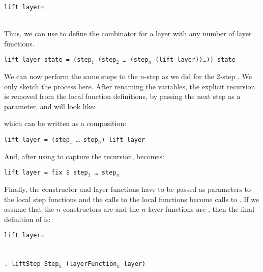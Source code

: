 \begin{small}
\begin{tabbing}
{\tt li}\={\tt ft l}\={\tt ayer= }\\
\\
\end{tabbing}
\end{small}

Thus, we can use   to define the  combinator for a layer with any number of layer functions.

\bc
\begin{tabbing}
{\tt l}\={\tt ift layer state = (step$_1$ (step$_2$ \dots ~(step$_n$ (lift layer))\dots)) state}\\
\end{tabbing}

We can now perform the same steps to the $n$-step  as we did for the 2-step . We only sketch the process here. After renaming the variables, the explicit recursion is removed from the local function definitions, by passing the next step as a parameter, and  will look like:


which can be written as a composition:

\begin{tabbing}
{\tt l}\={\tt ift layer = (step$_1$ \dots ~step$_n$) lift layer}\\
\end{tabbing}

And, after using  to capture the recursion, becomes:

\begin{tabbing}
{\tt l}\={\tt ift layer = fix \$ step$_1$ \dots ~step$_n$}\\
\end{tabbing}



Finally, the constructor and layer functions have to be passed as parameters to the local step functions and the calls to the local functions become calls to . If we assume that the $n$ constructors are  and the $n$ layer functions are , then the final definition of  is:

\begin{tabbing}
{\tt li}\={\tt ft l}\={\tt ayer= }\\
\\
\>\\ 
\>\>\verb|. lift|{\tt Step Step$_n$ (layerFunction$_n$ layer)}
\end{tabbing}


